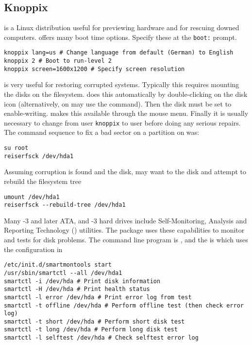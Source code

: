 \documentclass[12pt,twoside]{article}
\begin{document}
\subsection{Knoppix}\label{sxn:knp}
 is a Linux distribution useful for previewing
hardware and for rescuing downed computers.
 offers many boot time options.
Specify these at the \texttt{boot:} prompt.
\begin{verbatim}
knoppix lang=us # Change language from default (German) to English
knoppix 2 # Boot to run-level 2
knoppix screen=1600x1200 # Specify screen resolution
\end{verbatim}
 is very useful for restoring corrupted systems.
Typically this requires mounting the disks on the filesystem.
 does this automatically by double-clicking on the
disk icon (alternatively, on may use the  command).
Then the disk must be set to enable-writing.
 makes this available through the mouse menu.
Finally it is usually necessary to change from user \texttt{knoppix}
to user  before doing any serious repairs.
The command sequence to fix a bad sector on a 
partition on  was:
\begin{verbatim}
su root
reiserfsck /dev/hda1
\end{verbatim}
Assuming corruption is found and the disk,
may want to  the disk and attempt to rebuild the
filesystem tree
\begin{verbatim}
umount /dev/hda1
reiserfsck --rebuild-tree /dev/hda1
\end{verbatim}
Many -3 and later ATA,  and -3
hard drives include Self-Monitoring, Analysis and Reporting Technology
() utilities.
The  package uses these capabilities to monitor
and tests for disk problems. 
The command line program is , and the 
is  which uses the configuration in
\begin{verbatim}
/etc/init.d/smartmontools start
/usr/sbin/smartctl --all /dev/hda1
smartctl -i /dev/hda # Print disk information
smartctl -H /dev/hda # Print health status
smartctl -l error /dev/hda # Print error log from test
smartctl -t offline /dev/hda # Perform offline test (then check error log)
smartctl -t short /dev/hda # Perform short disk test
smartctl -t long /dev/hda # Perform long disk test
smartctl -l selftest /dev/hda # Check selftest error log
\end{verbatim}
\end{document}
